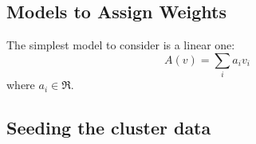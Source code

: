 \documentclass[paper.tex]{subfiles}
\begin{document}
	\subsection{Models to Assign Weights}
	The simplest model to consider is a linear one:
	\[A(v) = \sum_i a_i v_i \]
	where $a_i \in \Re$. 
	
	
	\subsection{Seeding the cluster data}
	
\end{document}
